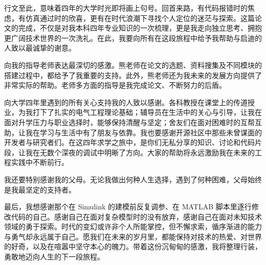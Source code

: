 \begin{acknowledgement}

行文至此，意味着四年的大学时光即将画上句号。回首来路，有代码报错时的焦虑，有仿真通过时的欣喜，更有在时代浪潮下寻找个人定位的迷茫与探索。这篇论文的完成，不仅是对我本科四年专业知识的一次梳理，更是我走向独立思考、拥抱更广阔技术世界的一次洗礼。在此，我要向所有在这段旅程中给予我帮助与启迪的人致以最诚挚的谢意。

向我的指导老师表达最深切的感激。熊老师在论文的选题、资料搜集及不同模块的搭建过程中，都给予了我重要的支持。此外，熊老师还为我未来的发展方向提供了非常实际的帮助。老师多方面的指导是我完成论文、不断努力的后盾。

向大学四年里遇到的所有关心支持我的人致以感谢。各科教授在课堂上的传道授业，为我打下了扎实的电气工程理论基础；辅导员在生活中的关心与引导，让我在面对升学压力与职业选择时，能够保持清醒与坚定；舍友们在面对困难时的互帮互助，让我在学习与生活中有了朋友与依靠。我也要感谢开源社区中那些未曾谋面的开发者与研究者们。在这四年求学之旅中，是你们无私分享的知识、讨论和代码片段，让我在无数个深夜的调试中明晰了方向。大家的帮助将永远激励我在未来的工程实践中不断前行。

我还要特别感谢我的父母。无论我做出何种人生选择，遇到了何种困难，父母始终是我最坚定的支持者。

最后，我想感谢那个在 Simulink 的建模前反复调参、在 MATLAB 脚本里逐行修改代码的自己。感谢自己在面对复杂模型时的没有放弃，感谢自己在面对未知技术领域的勇于探索。时代的变幻或许非个人所能掌控，但不懈求索，循序渐进的能力与勇气却永远属于自己。愿我们在未来的岁月里，都能保持对技术的热爱、对世界的好奇，以及在喧嚣中坚守本心的魄力。带着这份沉甸甸的感激，我将整理行装，勇敢地迈向人生的下一段旅程。
\end{acknowledgement}